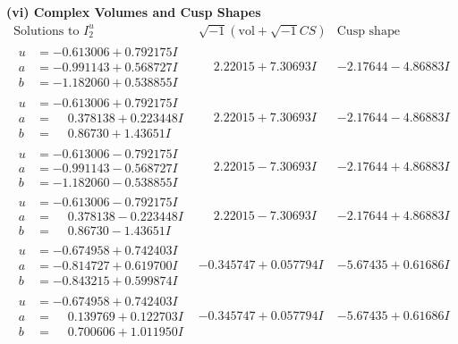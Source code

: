 \documentclass[1p]{elsarticle_modified}
\theoremstyle{definition}
\newcommand{\I}{\sqrt{-1}}
\begin{document}
\newpage\flushleft \textbf{(vi) Complex Volumes and Cusp Shapes}
$$\begin{array}{c|c|c}  
\text{Solutions to }I^u_{2}& \I (\text{vol} + \sqrt{-1}CS) & \text{Cusp shape}\\
 \hline 
\begin{aligned}
u &= -0.613006 + 0.792175 I \\
a &= -0.991143 + 0.568727 I \\
b &= -1.182060 + 0.538855 I\end{aligned}
 & \phantom{-}2.22015 + 7.30693 I & -2.17644 - 4.86883 I \\ \hline\begin{aligned}
u &= -0.613006 + 0.792175 I \\
a &= \phantom{-}0.378138 + 0.223448 I \\
b &= \phantom{-}0.86730 + 1.43651 I\end{aligned}
 & \phantom{-}2.22015 + 7.30693 I & -2.17644 - 4.86883 I \\ \hline\begin{aligned}
u &= -0.613006 - 0.792175 I \\
a &= -0.991143 - 0.568727 I \\
b &= -1.182060 - 0.538855 I\end{aligned}
 & \phantom{-}2.22015 - 7.30693 I & -2.17644 + 4.86883 I \\ \hline\begin{aligned}
u &= -0.613006 - 0.792175 I \\
a &= \phantom{-}0.378138 - 0.223448 I \\
b &= \phantom{-}0.86730 - 1.43651 I\end{aligned}
 & \phantom{-}2.22015 - 7.30693 I & -2.17644 + 4.86883 I \\ \hline\begin{aligned}
u &= -0.674958 + 0.742403 I \\
a &= -0.814727 + 0.619700 I \\
b &= -0.843215 + 0.599874 I\end{aligned}
 & -0.345747 + 0.057794 I & -5.67435 + 0.61686 I \\ \hline\begin{aligned}
u &= -0.674958 + 0.742403 I \\
a &= \phantom{-}0.139769 + 0.122703 I \\
b &= \phantom{-}0.700606 + 1.011950 I\end{aligned}
 & -0.345747 + 0.057794 I & -5.67435 + 0.61686 I \\ \hline\begin{aligned}

\end{aligned}
\end{array}$$
\end{document}
